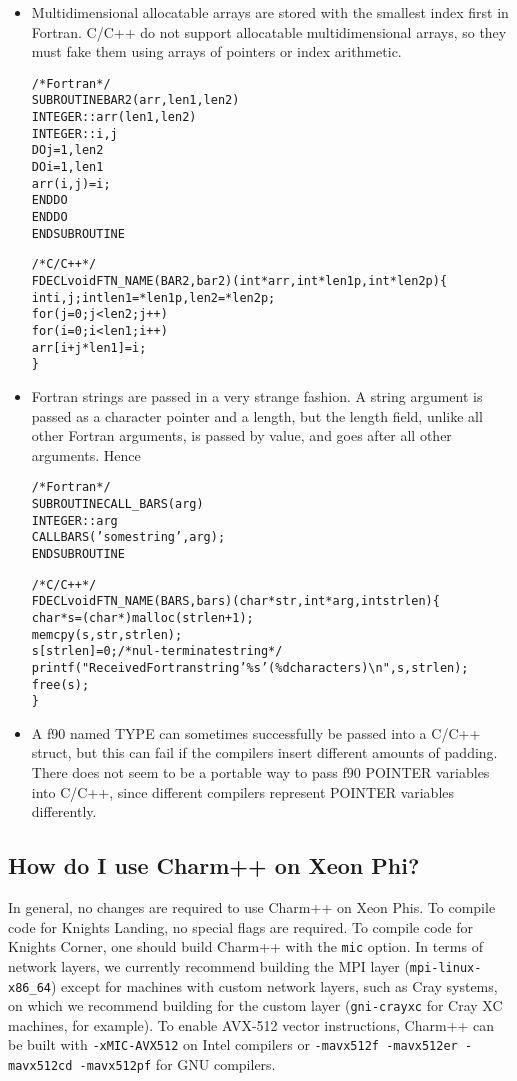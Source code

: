 \begin{itemize}
\item Multidimensional allocatable arrays are stored with
the smallest index first in Fortran.  C/C++ do not support
allocatable multidimensional arrays, so they must fake them
using arrays of pointers or index arithmetic.

\begin{alltt}
/* Fortran */
SUBROUTINE BAR2(arr,len1,len2) 
    INTEGER :: arr(len1,len2)
    INTEGER :: i,j
    DO j=1,len2
      DO i=1,len1
        arr(i,j)=i;
      END DO
    END DO
END SUBROUTINE

/* C/C++ */
FDECL void FTN\_NAME(BAR2,bar2)(int *arr,int *len1p,int *len2p) \{
    int i,j; int len1=*len1p, len2=*len2p;
    for (j=0;j<len2;j++)
    for (i=0;i<len1;i++)
        arr[i+j*len1]=i;
\}
\end{alltt}

\item Fortran strings are passed in a very strange fashion.
A string argument is passed as a character pointer and a 
length, but the length field, unlike all other Fortran arguments,
is passed by value, and goes after all other arguments.
Hence 

\begin{alltt}
/* Fortran */
SUBROUTINE CALL\_BARS(arg) 
    INTEGER :: arg
    CALL BARS('some string',arg);
END SUBROUTINE

/* C/C++ */
FDECL void FTN\_NAME(BARS,bars)(char *str,int *arg,int strlen) \{
    char *s=(char *)malloc(strlen+1);
    memcpy(s,str,strlen);
    s[strlen]=0; /* nul-terminate string */
    printf("Received Fortran string '\%s' (\%d characters){\textbackslash}n",s,strlen);
    free(s);
\}
\end{alltt}


\item A f90 named TYPE can sometimes successfully be passed into a 
C/C++ struct, but this can fail if the compilers insert different
amounts of padding.  There does not seem to be a portable way to 
pass f90 POINTER variables into C/C++, since different compilers
represent POINTER variables differently.  

\end{itemize}

\subsection{How do I use Charm++ on Xeon Phi?}

In general, no changes are required to use Charm++ on Xeon Phis. To
compile code for Knights Landing, no special flags are required. To
compile code for Knights Corner, one should build Charm++ with the
{\tt mic} option. In terms of network layers, we currently recommend
building the MPI layer ({\tt mpi-linux-x86\_64}) except for machines with
custom network layers, such as Cray systems, on which we recommend
building for the custom layer ({\tt gni-crayxc} for Cray XC machines,
for example). To enable AVX-512 vector instructions, Charm++ can be
built with {\tt -xMIC-AVX512} on Intel compilers or {\tt -mavx512f
  -mavx512er -mavx512cd -mavx512pf} for GNU compilers.
